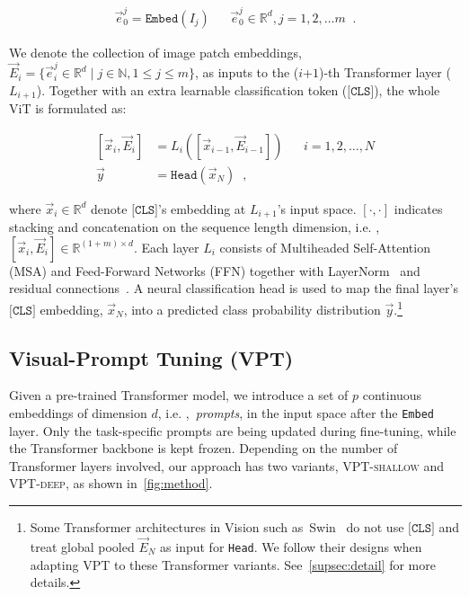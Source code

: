 \begin{align}
\label{eq:embed}
\vec{e}_0^j = \texttt{Embed}(I_j) &&\vec{e}_0^j\in\mathbb{R}^{d}, j = 1,2, \ldots m \;\;.
\end{align}

We denote the collection of image patch embeddings, 
$\vec{E}_{i}=\{\vec{e}_i^j\in\mathbb{R}^d\mid j\in\mathbb{N}, 1\le j\le m\}$,  
as inputs to the ($i$+$1$)-th Transformer layer ($L_{i+1}$). Together with an extra learnable classification token ($\texttt{[CLS]}$), the whole ViT is formulated as:

\begin{align}
\label{eq:vit}
    [\vec{x}_i, \vec{E}_i] &= L_i([\vec{x}_{i-1}, \vec{E}_{i-1}])  &&i=1, 2, \ldots, N \\
    \vec{y} &= \texttt{Head}(\vec{x}_N)\;\;,
\end{align}

where $\vec{x}_{i}\in\mathbb{R}^{d}$ denote $\texttt{[CLS]}$'s embedding at $L_{i+1}$'s input space. 
$[\cdot,\cdot]$ indicates stacking and concatenation on the sequence length dimension, i.e. , $[\vec{x}_{i}, \vec{E}_{i}]\in\mathbb{R}^{(1+m)\times d}$. Each layer $L_i$ consists of Multiheaded Self-Attention (MSA) and Feed-Forward Networks (FFN) together with LayerNorm~\cite{ba2016layer} and residual connections~\cite{he2016rn}. A neural classification head is used to map the final layer's $\texttt{[CLS]}$ embedding, $\vec{x}_{N}$, into a predicted class probability distribution $\vec{y}$.\footnote{Some Transformer architectures in Vision such as~Swin~\cite{liu2021swin} do not use $\texttt{[CLS]}$ and treat global pooled $\vec{E}_N$ as input for \texttt{Head}. We follow their designs when adapting VPT to these Transformer variants. See~\ref{supsec:detail} for more details.}

\subsection{Visual-Prompt Tuning (\textsc{VPT})}
\label{subsec:method_vp}

Given a pre-trained Transformer model, we introduce a set of $p$ continuous embeddings of dimension $d$, i.e. {},~\emph{prompts}, in the input space after the \texttt{Embed} layer. Only the task-specific prompts are being updated during fine-tuning, while the Transformer backbone is kept frozen. Depending on the number of Transformer layers involved, our approach has two variants, \textsc{VPT}-\textsc{shallow} and \textsc{VPT}-\textsc{deep}, as shown in~\ref{fig:method}.

